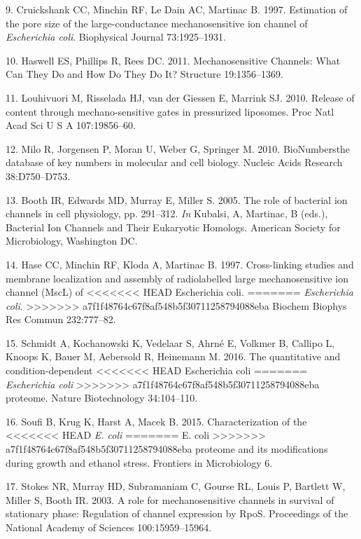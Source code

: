 \hypertarget{ref-cruickshank1997}{}
9.
Cruickshank
CC,
Minchin
RF, Le
Dain
AC,
Martinac
B.
1997.
Estimation
of the
pore
size
of the
large-conductance
mechanosensitive
ion
channel
of
\emph{Escherichia
coli}.
Biophysical
Journal
73:1925--1931.

\hypertarget{ref-haswell2011}{}
10.
Haswell
ES,
Phillips
R,
Rees
DC.
2011.
Mechanosensitive
Channels:
What
Can
They
Do and
How Do
They
Do It?
Structure
19:1356--1369.

\hypertarget{ref-louhivuori2010}{}
11.
Louhivuori
M,
Risselada
HJ,
van
der
Giessen
E,
Marrink
SJ.
2010.
Release
of
content
through
mechano-sensitive
gates
in
pressurized
liposomes.
Proc
Natl
Acad
Sci U
S A
107:19856--60.

\hypertarget{ref-milo2010}{}
12.
Milo
R,
Jorgensen
P,
Moran
U,
Weber
G,
Springer
M.
2010.
BioNumbersthe
database
of key
numbers
in
molecular
and
cell
biology.
Nucleic
Acids
Research
38:D750--D753.

\hypertarget{ref-booth2005}{}
13.
Booth
IR,
Edwards
MD,
Murray
E,
Miller
S.
2005.
The
role
of
bacterial
ion
channels
in
cell
physiology,
pp.
291--312.
\emph{In}
Kubalsi,
A,
Martinac,
B
(eds.),
Bacterial
Ion
Channels
and
Their
Eukaryotic
Homologs.
American
Society
for
Microbiology,
Washington
DC.

\hypertarget{ref-hase1997}{}
14.
Hase
CC,
Minchin
RF,
Kloda
A,
Martinac
B.
1997.
Cross-linking
studies
and
membrane
localization
and
assembly
of
radiolabelled
large
mechanosensitive
ion
channel
(MscL)
of
<<<<<<< HEAD
Escherichia
coli.
=======
\emph{Escherichia
coli}.
>>>>>>> a7f1f48764c67f8af548b5f30711258794088eba
Biochem
Biophys
Res
Commun
232:777--82.

\hypertarget{ref-schmidt2016}{}
15.
Schmidt
A,
Kochanowski
K,
Vedelaar
S,
Ahrné
E,
Volkmer
B,
Callipo
L,
Knoops
K,
Bauer
M,
Aebersold
R,
Heinemann
M.
2016.
The
quantitative
and
condition-dependent
<<<<<<< HEAD
Escherichia
coli
=======
\emph{Escherichia
coli}
>>>>>>> a7f1f48764c67f8af548b5f30711258794088eba
proteome.
Nature
Biotechnology
34:104--110.

\hypertarget{ref-soufi2015}{}
16.
Soufi
B,
Krug
K,
Harst
A,
Macek
B.
2015.
Characterization
of the
<<<<<<< HEAD
\emph{E.
coli}
=======
E.
coli
>>>>>>> a7f1f48764c67f8af548b5f30711258794088eba
proteome
and
its
modifications
during
growth
and
ethanol
stress.
Frontiers
in
Microbiology
6.

\hypertarget{ref-stokes2003a}{}
17.
Stokes
NR,
Murray
HD,
Subramaniam
C,
Gourse
RL,
Louis
P,
Bartlett
W,
Miller
S,
Booth
IR.
2003.
A role
for
mechanosensitive
channels
in
survival
of
stationary
phase:
Regulation
of
channel
expression
by
RpoS.
Proceedings
of the
National
Academy
of
Sciences
100:15959--15964.

